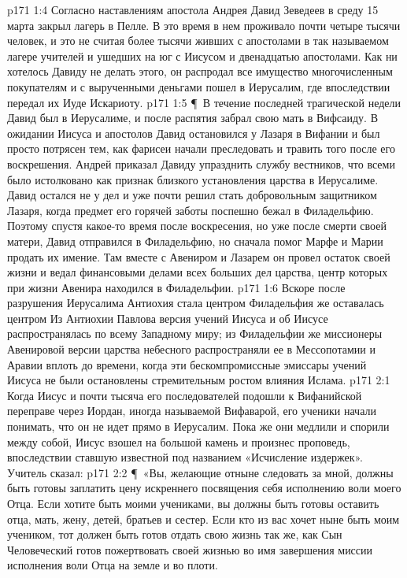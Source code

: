 \vs p171 1:4 Согласно наставлениям апостола Андрея Давид Зеведеев в среду 15 марта закрыл лагерь в Пелле. В это время в нем проживало почти четыре тысячи человек, и это не считая более тысячи живших с апостолами в так называемом лагере учителей и ушедших на юг с Иисусом и двенадцатью апостолами. Как ни хотелось Давиду не делать этого, он распродал все имущество многочисленным покупателям и с вырученными деньгами пошел в Иерусалим, где впоследствии передал их Иуде Искариоту.
\vs p171 1:5 \P\ В течение последней трагической недели Давид был в Иерусалиме, и после распятия забрал свою мать в Вифсаиду. В ожидании Иисуса и апостолов Давид остановился у Лазаря в Вифании и был просто потрясен тем, как фарисеи начали преследовать и травить того после его воскрешения. Андрей приказал Давиду упразднить службу вестников, что всеми было истолковано как признак близкого установления царства в Иерусалиме. Давид остался не у дел и уже почти решил стать добровольным защитником Лазаря, когда предмет его горячей заботы поспешно бежал в Филадельфию. Поэтому спустя какое\hyp{}то время после воскресения, но уже после смерти своей матери, Давид отправился в Филадельфию, но сначала помог Марфе и Марии продать их имение. Там вместе с Авениром и Лазарем он провел остаток своей жизни и ведал финансовыми делами всех больших дел царства, центр которых при жизни Авенира находился в Филадельфии.
\vs p171 1:6 Вскоре после разрушения Иерусалима Антиохия стала центром  Филадельфия же оставалась центром  Из Антиохии Павлова версия учений Иисуса и об Иисусе распространялась по всему Западному миру; из Филадельфии же миссионеры Авенировой версии царства небесного распространяли ее в Мессопотамии и Аравии вплоть до времени, когда эти бескомпромиссные эмиссары учений Иисуса не были остановлены стремительным ростом влияния Ислама.
\vs p171 2:1 Когда Иисус и почти тысяча его последователей подошли к Вифанийской переправе через Иордан, иногда называемой Вифаварой, его ученики начали понимать, что он не идет прямо в Иерусалим. Пока же они медлили и спорили между собой, Иисус взошел на большой камень и произнес проповедь, впоследствии ставшую известной под названием «Исчисление издержек». Учитель сказал:
\vs p171 2:2 \P\ «Вы, желающие отныне следовать за мной, должны быть готовы заплатить цену искреннего посвящения себя исполнению воли моего Отца. Если хотите быть моими учениками, вы должны быть готовы оставить отца, мать, жену, детей, братьев и сестер. Если кто из вас хочет ныне быть моим учеником, тот должен быть готов отдать свою жизнь так же, как Сын Человеческий готов пожертвовать своей жизнью во имя завершения миссии исполнения воли Отца на земле и во плоти.
